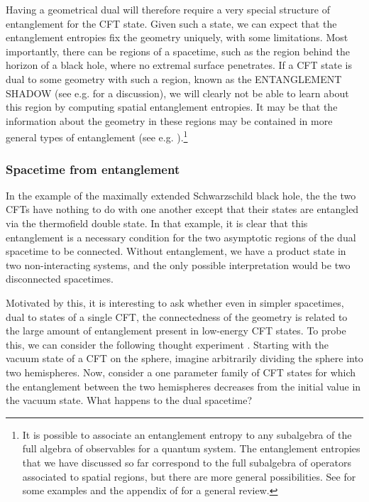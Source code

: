 \documentclass[12pt,epsf]{article}
\begin{document}
Having a geometrical dual will therefore require a very special structure of entanglement for the CFT state. Given such a state, we can expect that the entanglement entropies fix the geometry uniquely, with some limitations. Most importantly, there can be regions of a spacetime, such as the region behind the horizon of a black hole, where no extremal surface penetrates. If a CFT state is dual to some geometry with such a region, known as the ENTANGLEMENT SHADOW (see e.g. \cite{Engelhardt:2013tra} for a discussion), we will clearly not be able to learn about this region by computing spatial entanglement entropies. It may be that the information about the geometry in these regions may be contained in more general types of entanglement (see e.g. \cite{Balasubramanian:2014sra,Lin:2016fqk}).\footnote{It is possible to associate an entanglement entropy to any subalgebra of the full algebra of observables for a quantum system. The entanglement entropies that we have discussed so far correspond to the full subalgebra of operators associated to spatial regions, but there are more general possibilities. See \cite{Radicevic:2016tlt} for some examples and the appendix of \cite{Harlow:2016vwg} for a general review.}

\subsubsection*{Spacetime from entanglement}

In the example of the maximally extended Schwarzschild black hole, the the two CFTs have nothing to do with one another except that their states are entangled via the thermofield double state. In that example, it is clear that this entanglement is a necessary condition for the two asymptotic regions of the dual spacetime to be connected. Without entanglement, we have a product state in two non-interacting systems, and the only possible interpretation would be two disconnected spacetimes.

Motivated by this, it is interesting to ask whether even in simpler spacetimes, dual to states of a single CFT, the connectedness of the geometry is related to the large amount of entanglement present in low-energy CFT states. To probe this, we can consider the following thought experiment \cite{VanRaamsdonk:2009ar, VanRaamsdonk:2010pw}. Starting with the vacuum state of a CFT on the sphere, imagine arbitrarily dividing the sphere into two hemispheres. Now, consider a one parameter family of CFT states for which the entanglement between the two hemispheres decreases from the initial value in the vacuum state. What happens to the dual spacetime?
\end{document}
